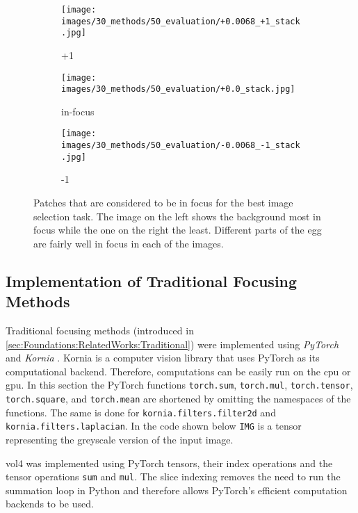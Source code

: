 \begin{figure}[tb]
    \centering
    \begin{subfigure}[t]{0.3\textwidth}
        \centering
        \texttt{[image: images/30\_methods/50\_evaluation/+0.0068\_+1\_stack.jpg]}
        \caption{+1}
    \end{subfigure}
    \begin{subfigure}[t]{0.3\textwidth}
        \centering
        \texttt{[image: images/30\_methods/50\_evaluation/+0.0\_stack.jpg]}
        \caption{in-focus}
    \end{subfigure}
    \begin{subfigure}[t]{0.3\textwidth}
        \centering
        \texttt{[image: images/30\_methods/50\_evaluation/-0.0068\_-1\_stack.jpg]}
        \caption{-1}
    \end{subfigure}

    \caption[In-focus patches for best image selection]{Patches that are considered to be in focus for the best image selection task. The image on the left shows the background most in focus while the one on the right the least. Different parts of the egg are fairly well in focus in each of the images.}
    \label{fig:Methods:Data:InFocusExampleImages}
\end{figure}


\subsection{Implementation of Traditional Focusing Methods}
\label{sec:Methods:Evaluation:Traditional}

Traditional focusing methods (introduced in \autoref{sec:Foundations:RelatedWorks:Traditional}) were implemented using \emph{PyTorch} \cite{paszke2019pytorch} and \emph{Kornia} \cite{riba2020kornia}. Kornia is a computer vision library that uses PyTorch as its computational backend. Therefore, computations can be easily run on the \ac{cpu} or \ac{gpu}. In this section the PyTorch functions \texttt{torch.sum}, \texttt{torch.mul}, \texttt{torch.tensor}, \texttt{torch.square}, and \texttt{torch.mean} are shortened by omitting the namespaces of the functions. The same is done for \texttt{kornia.filters.filter2d} and \texttt{kornia.filters.laplacian}. In the code shown below \texttt{IMG} is a tensor representing the greyscale version of the input image.

\Ac{vol4} was implemented using PyTorch tensors, their index operations and the tensor operations \texttt{sum} and \texttt{mul}. The slice indexing removes the need to run the summation loop in Python and therefore allows PyTorch's efficient computation backends to be used.

